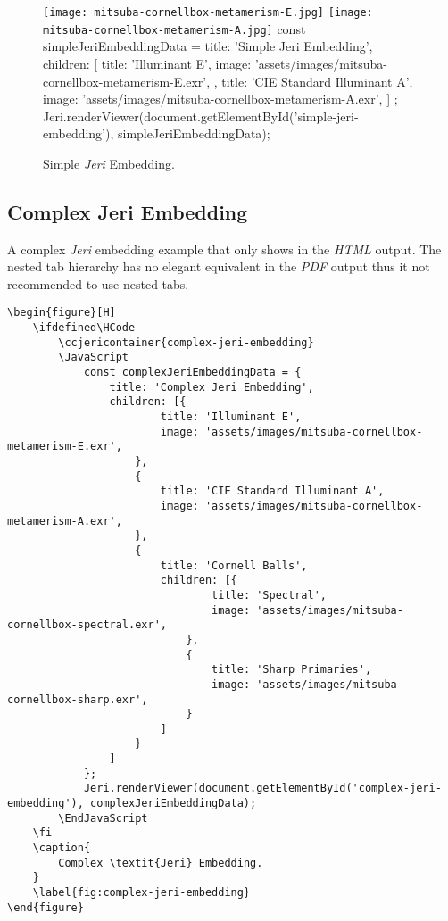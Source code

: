 \begin{figure}[H]
    \unless\ifdefined\HCode
        \texttt{[image: mitsuba-cornellbox-metamerism-E.jpg]}\hfill
        \texttt{[image: mitsuba-cornellbox-metamerism-A.jpg]}
    \fi
    \ifdefined\HCode
        \JavaScript
            const simpleJeriEmbeddingData = {
                title: 'Simple Jeri Embedding',
                children: [{
                        title: 'Illuminant E',
                        image: 'assets/images/mitsuba-cornellbox-metamerism-E.exr',
                    },
                    {
                        title: 'CIE Standard Illuminant A',
                        image: 'assets/images/mitsuba-cornellbox-metamerism-A.exr',
                    }
                ]
            };
            Jeri.renderViewer(document.getElementById('simple-jeri-embedding'), simpleJeriEmbeddingData);
        \EndJavaScript
    \fi
    \caption{
        Simple \textit{Jeri} Embedding.
    }
    \label{fig:simple-jeri-embedding}
\end{figure}

\subsection*{Complex Jeri Embedding}

A complex \textit{Jeri} embedding example that only shows in the \textit{HTML}
output. The nested tab hierarchy has no elegant equivalent in the \textit{PDF}
output thus it not recommended to use nested tabs.

\begin{lstlisting}[caption={Complex \textit{Jeri} Embedding.}]
\begin{figure}[H]
    \ifdefined\HCode
        \ccjericontainer{complex-jeri-embedding}
        \JavaScript
            const complexJeriEmbeddingData = {
                title: 'Complex Jeri Embedding',
                children: [{
                        title: 'Illuminant E',
                        image: 'assets/images/mitsuba-cornellbox-metamerism-E.exr',
                    },
                    {
                        title: 'CIE Standard Illuminant A',
                        image: 'assets/images/mitsuba-cornellbox-metamerism-A.exr',
                    },
                    {
                        title: 'Cornell Balls',
                        children: [{
                                title: 'Spectral',
                                image: 'assets/images/mitsuba-cornellbox-spectral.exr',
                            },
                            {
                                title: 'Sharp Primaries',
                                image: 'assets/images/mitsuba-cornellbox-sharp.exr',
                            }
                        ]
                    }
                ]
            };
            Jeri.renderViewer(document.getElementById('complex-jeri-embedding'), complexJeriEmbeddingData);
        \EndJavaScript
    \fi
    \caption{
        Complex \textit{Jeri} Embedding.
    }
    \label{fig:complex-jeri-embedding}
\end{figure}
\end{lstlisting}

